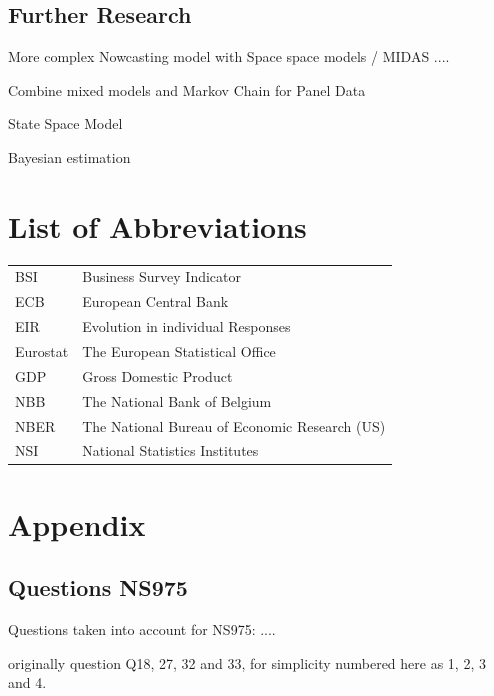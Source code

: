 \documentclass[12pt,a4paper,oneside]{book}
\begin{document}
\section{Further Research}



More complex Nowcasting model with Space space models / MIDAS ....

Combine mixed models and Markov Chain for Panel Data \citep{de_haan-rietdijk_use_2017} 

State Space Model

Bayesian estimation \cite{bialowolski_bayesian_nodate}

\nocite{hlavac_stargazer:_2018}


 

\chapter*{List of Abbreviations}

\begin{tabular}{l l}
  BSI   & Business Survey Indicator \\
  ECB   & European Central Bank \\
  EIR   & Evolution in individual Responses \\
  Eurostat & The European Statistical Office \\
  GDP   & Gross Domestic Product \\
  NBB   & The National Bank of Belgium \\
  NBER  & The National Bureau of Economic Research (US) \\
  NSI   & National Statistics Institutes
\end{tabular}

  
\begin{appendix}
  \listoffigures
  \listoftables
\end{appendix}


\chapter*{Appendix}

\section{Questions NS975}
Questions taken into account for NS975:
....

originally question Q18, 27, 32 and 33, for simplicity numbered here as 1, 2, 3 and 4.
\end{document}
